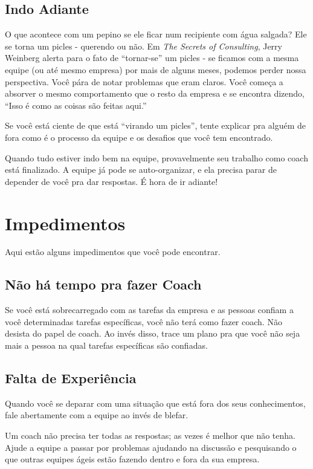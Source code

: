 \documentclass[a4paper, 10pt, font=plain]{abnt}
\begin{document}
\subsection{Indo Adiante}
O que acontece com um pepino se ele ficar num recipiente com água salgada? Ele se torna um picles - querendo ou não. Em \textit{The Secrets of Consulting}, Jerry Weinberg alerta para o fato de ``tornar-se'' um picles - se ficamos com a mesma equipe (ou até mesmo empresa) por mais de alguns meses, podemos perder nossa perspectiva. Você pára de notar problemas que eram claros. Você começa a absorver o mesmo comportamento que o resto da empresa e se encontra dizendo, ``Isso é como as coisas são feitas aqui.''

Se você está ciente de que está ``virando um picles'', tente explicar pra alguém de fora como é o processo da equipe e os desafios que você tem encontrado.

Quando tudo estiver indo bem na equipe, provavelmente seu trabalho como coach está finalizado. A equipe já pode se auto-organizar, e ela precisa parar de depender de você pra dar respostas. É hora de ir adiante!


\section{Impedimentos}
Aqui estão alguns impedimentos que você pode encontrar.

\subsection{Não há tempo pra fazer Coach}
Se você está sobrecarregado com as tarefas da empresa e as pessoas confiam a você determinadas tarefas específicas, você não terá como fazer coach. Não desista do papel de coach. Ao invés disso, trace um plano pra que você não seja mais a pessoa na qual tarefas específicas são confiadas.

\subsection{Falta de Experiência}
Quando você se deparar com uma situação que está fora dos seus conhecimentos, fale abertamente com a equipe ao invés de blefar.

Um coach não precisa ter todas as respostas; as vezes é melhor que não tenha. Ajude a equipe a passar por problemas ajudando na discussão e pesquisando o que outras equipes ágeis estão fazendo dentro e fora da sua empresa.
\end{document}
